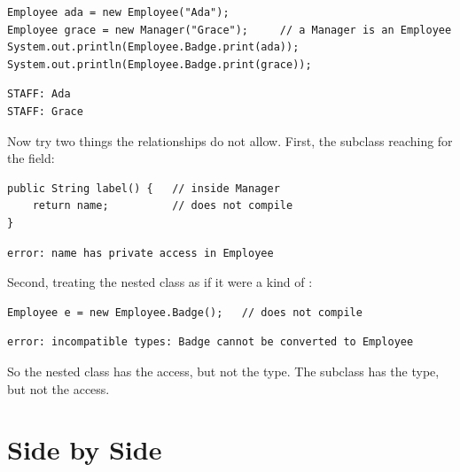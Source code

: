 \documentclass[11pt]{article}
\begin{document}
\begin{lstlisting}
Employee ada = new Employee("Ada");
Employee grace = new Manager("Grace");     // a Manager is an Employee
System.out.println(Employee.Badge.print(ada));
System.out.println(Employee.Badge.print(grace));
\end{lstlisting}

\begin{lstlisting}[style=sh]
STAFF: Ada
STAFF: Grace
\end{lstlisting}

Now try two things the relationships do not allow. First, the subclass reaching for the
 field:

\begin{lstlisting}
public String label() {   // inside Manager
    return name;          // does not compile
}
\end{lstlisting}

\begin{lstlisting}[style=sh]
error: name has private access in Employee
\end{lstlisting}

Second, treating the nested class as if it were a kind of :

\begin{lstlisting}
Employee e = new Employee.Badge();   // does not compile
\end{lstlisting}

\begin{lstlisting}[style=sh]
error: incompatible types: Badge cannot be converted to Employee
\end{lstlisting}

So the nested class has the access, but not the type. The subclass has the type, but not the
access.

\section{Side by Side}
\end{document}
